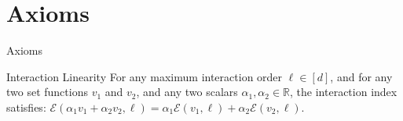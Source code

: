 \documentclass[10pt]{beamer}
\newcommand{\f}{v}
\newcommand{\ex}{\Expl}
\def\Expl{\mathcal{E}}
\begin{document}
\section[Axioms]{Axioms}

\begin{frame}{Axioms}
    \begin{myaxiombox}{Interaction Linearity}
    For any maximum interaction order $\ell \in [d]$, and for any two set functions $\f_1$ and $\f_2$, and any two scalars $\alpha_1, \alpha_2 \in \mathbb{R}$, the interaction index satisfies: $\ex(\alpha_1 \f_1+ \alpha_2 \f_2,\ell) = \alpha_1 \ex(\f_1,\ell) + \alpha_2 \ex(\f_2,\ell)$.
    \end{myaxiombox}
\end{frame}
\begin{frmae}

    

    
\end{frmae}






\end{document}
